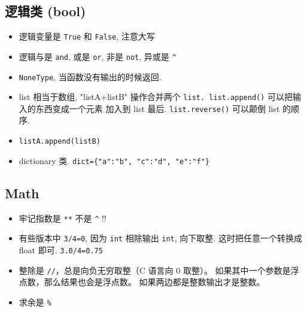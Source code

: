 \subsection{逻辑类 (bool)}
\begin{itemize}
\item 逻辑变量是 \verb`True` 和 \verb`False`, 注意大写
\item 逻辑与是 \verb`and`, 或是 \verb`or`, 非是 \verb`not`, 异或是 \verb`^`
\item \verb`NoneType`, 当函数没有输出的时候返回.
\item list 相当于数组, "listA+listB" 操作合并两个 \verb`list. list.append()` 可以把输入的东西变成一个元素
    加入到 list 最后.  \verb`list.reverse()` 可以颠倒 list 的顺序.
\item \verb`listA.append(listB)`
\item dictionary 类.  \verb`dict={"a":"b", "c":"d", "e":"f"}`
\end{itemize}

\subsection{Math}
\begin{itemize}
\item 牢记指数是 \verb`**` 不是 \verb`^` !!
\item 有些版本中 \verb`3/4=0`, 因为 \verb`int` 相除输出 \verb`int`, 向下取整. 这时把任意一个转换成 float 即可. \verb`3.0/4=0.75`
\item 整除是 \verb`//`，总是向负无穷取整（C 语言向 0 取整）。 如果其中一个参数是浮点数，那么结果也会是浮点数。 如果两边都是整数输出才是整数。
\item 求余是 \verb`%`
\end{itemize}

